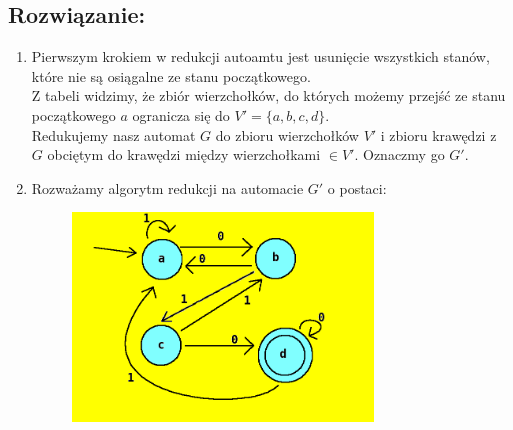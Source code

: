 \documentclass[12pt]{article}
\begin{document}
\subsection*{Rozwiązanie:}
\begin{enumerate}
    \item Pierwszym krokiem w redukcji autoamtu jest usunięcie wszystkich stanów, które nie są osiągalne
    ze stanu początkowego.\\
    Z tabeli widzimy, że zbiór wierzchołków, do których możemy przejść ze stanu początkowego
    $a$ ogranicza się do $V' = \{a,b,c,d\}.$
    \\Redukujemy nasz automat $G$ do zbioru wierzchołków $V'$ i zbioru krawędzi z $G$ obciętym do krawędzi między wierzchołkami $\in V'$. Oznaczmy go $G'$.
    \item Rozważamy algorytm redukcji na automacie $G'$ o postaci:\\
    \begin{figure}[htp]
        \centering
        \includegraphics[width=8cm]{automat_kolor.png}
    \end{figure}


\end{enumerate}
\end{document}
